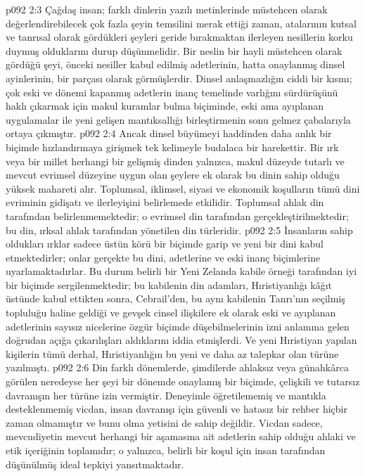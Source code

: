 \vs p092 2:3 Çağdaş insan; farklı dinlerin yazılı metinlerinde müstehcen olarak değerlendirebilecek çok fazla şeyin temsilini merak ettiği zaman, atalarının kutsal ve tanrısal olarak gördükleri şeyleri geride bırakmaktan ilerleyen nesillerin korku duymuş olduklarını durup düşünmelidir. Bir neslin bir hayli müstehcen olarak gördüğü şeyi, önceki nesiller kabul edilmiş adetlerinin, hatta onaylanmış dinsel ayinlerinin, bir parçası olarak görmüşlerdir. Dinsel anlaşmazlığın ciddi bir kısmı; çok eski ve dönemi kapanmış adetlerin inanç temelinde varlığını sürdürüşünü haklı çıkarmak için makul kuramlar bulma biçiminde, eski ama ayıplanan uygulamalar ile yeni gelişen mantıksallığı birleştirmenin sonu gelmez çabalarıyla ortaya çıkmıştır.
\vs p092 2:4 Ancak dinsel büyümeyi haddinden daha anlık bir biçimde hızlandırmaya girişmek tek kelimeyle budalaca bir harekettir. Bir ırk veya bir millet herhangi bir gelişmiş dinden yalnızca, makul düzeyde tutarlı ve mevcut evrimsel düzeyine uygun olan şeylere ek olarak bu dinin sahip olduğu yüksek mahareti alır. Toplumsal, iklimsel, siyasi ve ekonomik koşulların tümü dini evriminin gidişatı ve ilerleyişini belirlemede etkilidir. Toplumsal ahlak din tarafından belirlenmemektedir; o evrimsel din tarafından gerçekleştirilmektedir; bu din, ırksal ahlak tarafından yönetilen din türleridir.
\vs p092 2:5 İnsanların sahip oldukları ırklar sadece üstün körü bir biçimde garip ve yeni bir dini kabul etmektedirler; onlar gerçekte bu dini, adetlerine ve eski inanç biçimlerine uyarlamaktadırlar. Bu durum belirli bir Yeni Zelanda kabile örneği tarafından iyi bir biçimde sergilenmektedir; bu kabilenin din adamları, Hıristiyanlığı kâğıt üstünde kabul ettikten sonra, Cebrail’den, bu aynı kabilenin Tanrı’nın seçilmiş topluluğu haline geldiği ve gevşek cinsel ilişkilere ek olarak eski ve ayıplanan adetlerinin sayısız nicelerine özgür biçimde düşebilmelerinin izni anlamına gelen doğrudan açığa çıkarılışları aldıklarını iddia etmişlerdi. Ve yeni Hıristiyan yapılan kişilerin tümü derhal, Hıristiyanlığın bu yeni ve daha az talepkar olan türüne yazılmıştı.
\vs p092 2:6 Din farklı dönemlerde, şimdilerde ahlaksız veya günahkârca görülen neredeyse her şeyi bir dönemde onaylamış bir biçimde, çelişkili ve tutarsız davranışın her türüne izin vermiştir. Deneyimle öğretilememiş ve mantıkla desteklenmemiş vicdan, insan davranışı için güvenli ve hatasız bir rehber hiçbir zaman olmamıştır ve bunu olma yetisini de sahip değildir. Vicdan sadece, mevcudiyetin mevcut herhangi bir aşamasına ait adetlerin sahip olduğu ahlaki ve etik içeriğinin toplamıdır; o yalnızca, belirli bir koşul için insan tarafından düşünülmüş ideal tepkiyi yansıtmaktadır.
